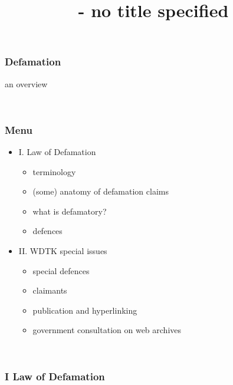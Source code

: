 \documentclass[ignorenonframetext,]{beamer}
\title{- no title specified}
\date{}
\begin{document}
\frame{\titlepage}

\begin{frame}
\frametitle{{Defamation}}

{an overview}

~


\end{frame}

\begin{frame}
\frametitle{Menu}

\begin{itemize}
\item  I. Law of Defamation

  \begin{itemize}
  \item    terminology
  \item    (some) anatomy of defamation claims
  \item    what is defamatory?
  \item    defences
  \end{itemize}
\item  II. WDTK special issues

  \begin{itemize}
  \item    special defences
  \item    claimants
  \item    publication and hyperlinking
  \item    government consultation on web archives
  \end{itemize}
\end{itemize}

~


\end{frame}

\begin{frame}
\frametitle{{I Law of Defamation}}

~


\end{frame}
\end{document}
